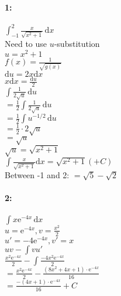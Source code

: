 \documentclass[12pt]{article}
\newcommand{\me}{\mathrm{e}}
\newcommand{\dx}{\mathrm{d}x}
\newcommand{\du}{\mathrm{d}u}
\begin{document}
    \newpage


    \paragraph*{1:\\}
    $\int_{-1}^{2} \! \frac{x}{\sqrt{x^2 + 1}} \, \dx$\\
    Need to use $u$-substitution\\
    $u = x^2 + 1$\\
    $f(x) = \frac{1}{\sqrt{g(x)}}$\\
    $\du = 2x\dx$\\
    $x\dx = \frac{\du}{2}$\\
    $\int \! \frac{1}{2\sqrt{u}}\,\du$\\
    $= \frac{1}{2} \int \! \frac{1}{2\sqrt{u}}\,\du$\\
    $= \frac{1}{2} \int \! u^{-1/2} \, \du $\\
    $= \frac{1}{2} \cdot 2 \sqrt{u}$\\
    $= \sqrt{u}$\\
    $\sqrt{u} = \sqrt{x^2 + 1}$\\
    $\int \! \frac{x}{\sqrt{x^2 + 1}}\dx = \sqrt{x^2 + 1} (+ C)$\\
    Between -1 and 2:
    $= \sqrt{5} - \sqrt{2}$\\

    \paragraph{2:\\}
    $\int \! x\me^{-4x} \, \dx$\\
    $u = \me^{-4x}, v = \frac{x^2}{2}$\\
    $u' = -4\me^{-4x}, v' = x$\\
    $uv - \int \! vu'$\\
    $\frac{x^2\me^{-4x}}{2} - \int \frac{-4x^2\me^{-4x}}{2}$\\
    $=\frac{x^2\me^{-4x}}{2} - \frac{(8x^2 + 4x + 1)\cdot \me^{-4x}}{16}$\\
    $=\frac{-(4x + 1)\cdot\me^{-4x}}{16} + C$\\
\end{document}
